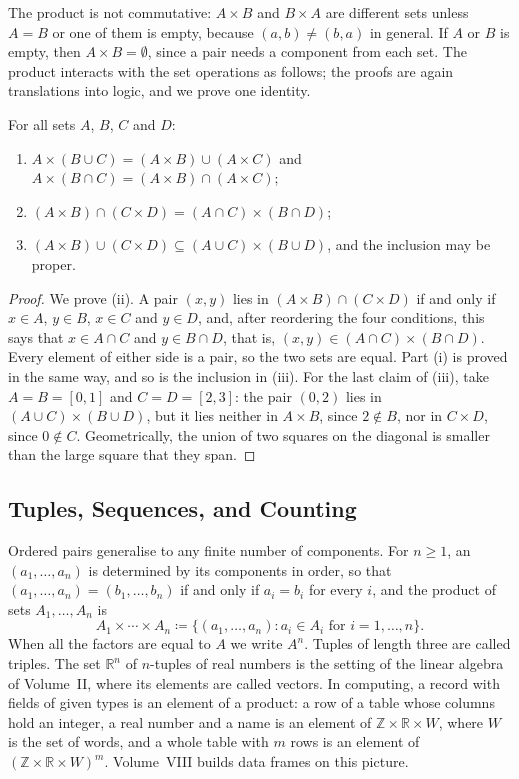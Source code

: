 The product is not commutative: $A\times B$ and $B\times A$ are different sets unless $A=B$ or one of them is empty, because $(a,b)\ne(b,a)$ in general. If $A$ or $B$ is empty, then $A\times B=\emptyset$, since a pair needs a component from each set. The product interacts with the set operations as follows; the proofs are again translations into logic, and we prove one identity.

\begin{proposition}
\label{prop:product-laws}
For all sets $A$, $B$, $C$ and $D$:
\begin{enumerate}
\item $A\times(B\cup C)=(A\times B)\cup(A\times C)$ and $A\times(B\cap C)=(A\times B)\cap(A\times C)$;
\item $(A\times B)\cap(C\times D)=(A\cap C)\times(B\cap D)$;
\item $(A\times B)\cup(C\times D)\subseteq(A\cup C)\times(B\cup D)$, and the inclusion may be proper.
\end{enumerate}
\end{proposition}

\begin{proof}
We prove (ii). A pair $(x,y)$ lies in $(A\times B)\cap(C\times D)$ if and only if $x\in A$, $y\in B$, $x\in C$ and $y\in D$, and, after reordering the four conditions, this says that $x\in A\cap C$ and $y\in B\cap D$, that is, $(x,y)\in(A\cap C)\times(B\cap D)$. Every element of either side is a pair, so the two sets are equal. Part (i) is proved in the same way, and so is the inclusion in (iii). For the last claim of (iii), take $A=B=[0,1]$ and $C=D=[2,3]$: the pair $(0,2)$ lies in $(A\cup C)\times(B\cup D)$, but it lies neither in $A\times B$, since $2\notin B$, nor in $C\times D$, since $0\notin C$. Geometrically, the union of two squares on the diagonal is smaller than the large square that they span.
\end{proof}

\subsection{Tuples, Sequences, and Counting}

Ordered pairs generalise to any finite number of components. For $n\ge1$, an  $(a_1,\ldots,a_n)$ is determined by its components in order, so that $(a_1,\ldots,a_n)=(b_1,\ldots,b_n)$ if and only if $a_i=b_i$ for every $i$, and the product of sets $A_1,\ldots,A_n$ is
\[
A_1\times\cdots\times A_n\coloneqq\{(a_1,\ldots,a_n): a_i\in A_i\text{ for }i=1,\ldots,n\}.
\]
When all the factors are equal to $A$ we write $A^n$. Tuples of length three are called triples. The set $\mathbb R^n$ of $n$-tuples of real numbers is the setting of the linear algebra of Volume~II, where its elements are called vectors. In computing, a record with fields of given types is an element of a product: a row of a table whose columns hold an integer, a real number and a name is an element of $\mathbb Z\times\mathbb R\times W$, where $W$ is the set of words, and a whole table with $m$ rows is an element of $(\mathbb Z\times\mathbb R\times W)^m$. Volume~VIII builds data frames on this picture.

